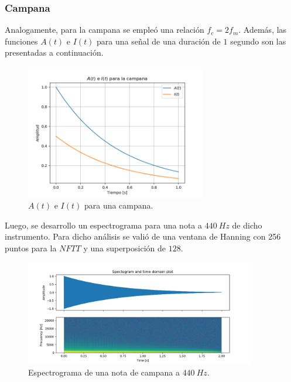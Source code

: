 \subsubsection{Campana}
Analogamente, para la campana se empleó una relación $ f_c = 2 f_m$. Además, las funciones $A(t)$ e $I(t)$ para una señal de una duración de $1$ segundo son las presentadas a continuación.
\begin{figure}[H]
	\centering
	\includegraphics[width=0.7\textwidth]{ImagenesEjercicio3/A-I-Bell.png}
	\caption{$A(t)$ e $I(t)$ para una campana.}
	\label{fig:aibell}
\end{figure}

Luego, se desarrollo un espectrograma para una nota a $440 \ Hz$ de dicho instrumento. Para dicho análisis se valió de una ventana de Hanning con 256 puntos para la $NFTT$ y una superposición de $128$.  
\begin{figure}[H]
	\centering
	\includegraphics[width=0.9\textwidth]{ImagenesEjercicio3/Bell-440-Hanning-256-128.png}
	\caption{Espectrograma de una nota de campana a $440 \ Hz$.}
	\label{fig:specbell}
\end{figure}

